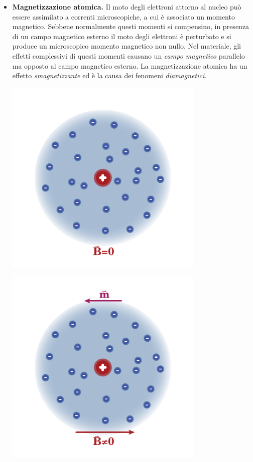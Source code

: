 \begin{itemize}
	\item \textbf{Magnetizzazione atomica.} Il moto degli elettroni attorno al nucleo può essere assimilato a correnti microscopiche, a cui è associato un momento magnetico. Sebbene normalmente questi momenti si compensino, in presenza di un campo magnetico esterno il moto degli elettroni è perturbato e si produce un microscopico momento magnetico non nullo. Nel materiale, gli effetti complessivi di questi momenti causano un \textit{campo magnetico} parallelo ma opposto al campo magnetico esterno. La magnetizzazione atomica ha un effetto \textit{smagnetizzante} ed è la causa dei fenomeni \textit{diamagnetici}.\\
	\begin{minipage}{0.49\textwidth}
		\begin{center}
			\includegraphics[width=0.75\textwidth]{images/chp12/chp12polarizzazionenucleo1.pdf}
		\end{center}
	\end{minipage}
	\begin{minipage}{0.49\textwidth}
		\begin{center}
			\includegraphics[width=0.75\textwidth]{images/chp12/chp12polarizzazionenucleo2.pdf}

\end{center}
\end{minipage}
\end{itemize}
